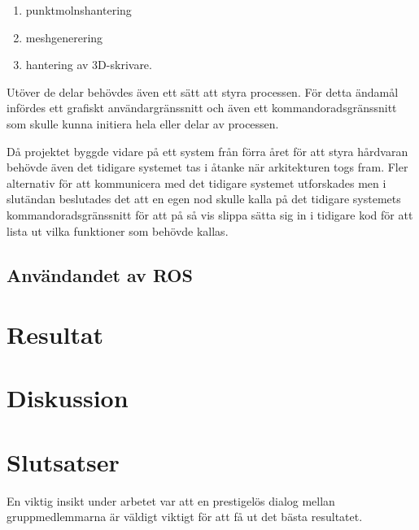 \begin{enumerate}
	\item punktmolnshantering
	\item meshgenerering
	\item hantering av 3D-skrivare.
\end{enumerate}

Utöver de delar behövdes även ett sätt att styra processen. För detta ändamål infördes ett grafiskt användargränssnitt och även ett kommandoradsgränssnitt som skulle kunna initiera hela eller delar av processen.

Då projektet byggde vidare på ett system från förra året för att styra hårdvaran behövde även det tidigare systemet tas i åtanke när arkitekturen togs fram. Fler alternativ för att kommunicera med det tidigare systemet utforskades men i slutändan beslutades det att en egen nod skulle kalla på det tidigare systemets kommandoradsgränssnitt för att på så vis slippa sätta sig in i tidigare kod för att lista ut vilka funktioner som behövde kallas.

\subsection{Användandet av ROS}


\section{Resultat}
\label{sec:results-lundberg}



\section{Diskussion}
\label{sec:discussion-lundberg}



\section{Slutsatser}
\label{sec:conclusions-lundberg}

En viktig insikt under arbetet var att en prestigelös dialog mellan gruppmedlemmarna är väldigt viktigt för att få ut det bästa resultatet.


